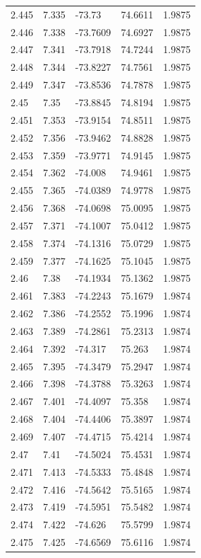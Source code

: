\begin{tabular}{lllll}
2.445 & 7.335 & -73.73 & 74.6611 & 1.9875 \\
2.446 & 7.338 & -73.7609 & 74.6927 & 1.9875 \\
2.447 & 7.341 & -73.7918 & 74.7244 & 1.9875 \\
2.448 & 7.344 & -73.8227 & 74.7561 & 1.9875 \\
2.449 & 7.347 & -73.8536 & 74.7878 & 1.9875 \\
2.45 & 7.35 & -73.8845 & 74.8194 & 1.9875 \\
2.451 & 7.353 & -73.9154 & 74.8511 & 1.9875 \\
2.452 & 7.356 & -73.9462 & 74.8828 & 1.9875 \\
2.453 & 7.359 & -73.9771 & 74.9145 & 1.9875 \\
2.454 & 7.362 & -74.008 & 74.9461 & 1.9875 \\
2.455 & 7.365 & -74.0389 & 74.9778 & 1.9875 \\
2.456 & 7.368 & -74.0698 & 75.0095 & 1.9875 \\
2.457 & 7.371 & -74.1007 & 75.0412 & 1.9875 \\
2.458 & 7.374 & -74.1316 & 75.0729 & 1.9875 \\
2.459 & 7.377 & -74.1625 & 75.1045 & 1.9875 \\
2.46 & 7.38 & -74.1934 & 75.1362 & 1.9875 \\
2.461 & 7.383 & -74.2243 & 75.1679 & 1.9874 \\
2.462 & 7.386 & -74.2552 & 75.1996 & 1.9874 \\
2.463 & 7.389 & -74.2861 & 75.2313 & 1.9874 \\
2.464 & 7.392 & -74.317 & 75.263 & 1.9874 \\
2.465 & 7.395 & -74.3479 & 75.2947 & 1.9874 \\
2.466 & 7.398 & -74.3788 & 75.3263 & 1.9874 \\
2.467 & 7.401 & -74.4097 & 75.358 & 1.9874 \\
2.468 & 7.404 & -74.4406 & 75.3897 & 1.9874 \\
2.469 & 7.407 & -74.4715 & 75.4214 & 1.9874 \\
2.47 & 7.41 & -74.5024 & 75.4531 & 1.9874 \\
2.471 & 7.413 & -74.5333 & 75.4848 & 1.9874 \\
2.472 & 7.416 & -74.5642 & 75.5165 & 1.9874 \\
2.473 & 7.419 & -74.5951 & 75.5482 & 1.9874 \\
2.474 & 7.422 & -74.626 & 75.5799 & 1.9874 \\
2.475 & 7.425 & -74.6569 & 75.6116 & 1.9874 \\

\end{tabular}
